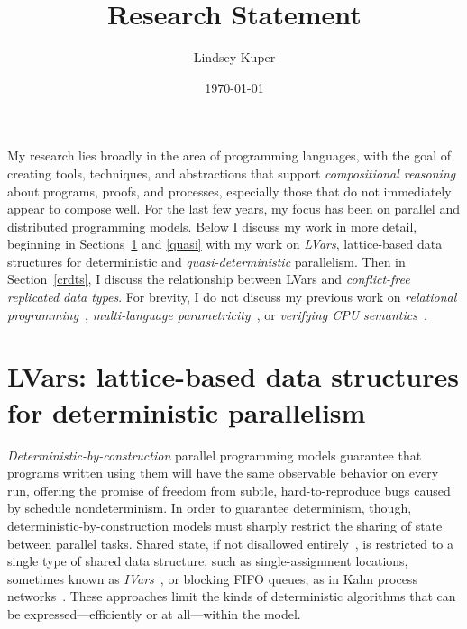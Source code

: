\documentclass[10pt, letterpaper]{article}
\def\name{Lindsey Kuper}
\begin{document}
\title{Research Statement}

\author{\name}

\date{\today}

\maketitle


\noindent My research lies broadly in the area of programming
languages, with the goal of creating tools, techniques, and
abstractions that support \emph{compositional reasoning} about
programs, proofs, and processes, especially those that do not
immediately appear to compose well.  For the last few years, my focus
has been on parallel and distributed programming models.  Below I
discuss my work in more detail, beginning in Sections~\ref{lvars} and
\ref{quasi} with my work on \emph{LVars}, lattice-based data
structures for deterministic and \emph{quasi-deterministic}
parallelism.  Then in Section~\ref{crdts}, I discuss the relationship
between LVars and \emph{conflict-free replicated data types}.  For
brevity, I do not discuss my previous work on \emph{relational
  programming}~\cite{lambdae}, \emph{multi-language
  parametricity}~\cite{multilang-talk}, or \emph{verifying CPU
  semantics}~\cite{tsl-tr}.

\section{LVars: lattice-based data structures for deterministic parallelism}\label{lvars}


\emph{Deterministic-by-construction} parallel programming models
guarantee that programs written using them will have the same
observable behavior on every run, offering the promise of freedom from
subtle, hard-to-reproduce bugs caused by schedule nondeterminism.  In
order to guarantee determinism, though, deterministic-by-construction
models must sharply restrict the sharing of state between parallel
tasks.  Shared state, if not disallowed entirely~\cite{dph,
  dpj-oopsla}, is restricted to a single type of shared data
structure, such as single-assignment locations, sometimes known as
\emph{IVars}~\cite{IStructures, CnC}, or blocking FIFO queues, as in
Kahn process networks~\cite{Kahn-1974}.  These approaches limit the
kinds of deterministic algorithms that can be expressed---efficiently
or at all---within the model.
\end{document}
